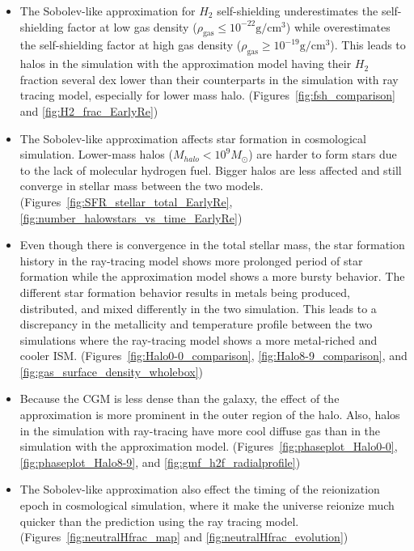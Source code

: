\documentclass[linenumbers, twocolumn]{aastex631}
\begin{document}
\begin{itemize}
	\item The Sobolev-like approximation for $H_{2}$ self-shielding underestimates the self-shielding factor at low gas density ($\rho_\mathrm{gas} \leq 10^{-22} \mathrm{g}/\mathrm{cm}^{3}$) while overestimates the self-shielding factor at high gas density ($\rho_\mathrm{gas} \geq 10^{-19} \mathrm{g}/\mathrm{cm}^{3}$). This leads to halos in the simulation with the approximation model having their $H_{2}$ fraction several dex lower than their counterparts in the simulation with ray tracing model, especially for lower mass halo. (Figures~\ref{fig:fsh_comparison} and \ref{fig:H2_frac_EarlyRe}) 
	\item The Sobolev-like approximation affects star formation in cosmological simulation. Lower-mass halos ($M_{halo} < 10^{9} M_\odot$) are harder to form stars due to the lack of molecular hydrogen fuel. Bigger halos are less affected and still converge in stellar mass between the two models. (Figures~\ref{fig:SFR_stellar_total_EarlyRe}, \ref{fig:number_halowstars_vs_time_EarlyRe}) 
	\item Even though there is convergence in the total stellar mass, the star formation history in the ray-tracing model shows more prolonged period of star formation while the approximation model shows a more bursty behavior. The different star formation behavior results in metals being produced, distributed, and mixed differently in the two simulation.  This leads to a discrepancy in the metallicity and temperature profile between the two simulations where the ray-tracing model shows a more metal-riched and cooler ISM. (Figures~\ref{fig:Halo0-0_comparison}, \ref{fig:Halo8-9_comparison}, and \ref{fig:gas_surface_density_wholebox})
	\item Because the CGM is less dense than the galaxy, the effect of the approximation is more prominent in the outer region of the halo. Also, halos in the simulation with ray-tracing have more cool diffuse gas than in the simulation with the approximation model. (Figures~\ref{fig:phaseplot_Halo0-0}, \ref{fig:phaseplot_Halo8-9}, and \ref{fig:gmf_h2f_radialprofile})
	\item The Sobolev-like approximation also effect the timing of the reionization epoch in cosmological simulation, where it make the universe reionize much quicker than the prediction using the ray tracing model. (Figures~\ref{fig:neutralHfrac_map} and \ref{fig:neutralHfrac_evolution})
\end{itemize}
\end{document}
